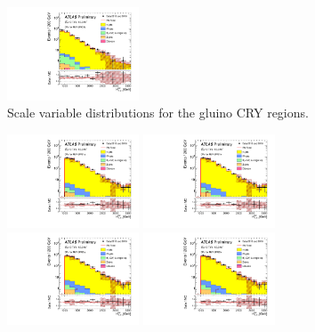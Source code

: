 \begin{figure}[tbph]
\begin{center}
\includegraphics[width=0.35\textwidth]{figures/ATLAS-CONF-2016-078_INT/N-1Plots/AtlasStyle/Preliminary/CRY_SRJigsawSRG3b_LastCut_CRY_minusone}
\end{center}
\caption{Scale variable distributions for the gluino CRY regions.}
\label{fig:CRY_SRJigsawSRG3a_LastCut_CRY_minusone}
\end{figure}

\clearpage
\begin{figure}[tbph]
\begin{center}
\includegraphics[width=0.35\textwidth]{figures/ATLAS-CONF-2016-078_INT/N-1Plots/AtlasStyle/Preliminary/CRY_SRJigsawSRS1a_LastCut_CRY_minusone}
\includegraphics[width=0.35\textwidth]{figures/ATLAS-CONF-2016-078_INT/N-1Plots/AtlasStyle/Preliminary/CRY_SRJigsawSRS1b_LastCut_CRY_minusone}
\includegraphics[width=0.35\textwidth]{figures/ATLAS-CONF-2016-078_INT/N-1Plots/AtlasStyle/Preliminary/CRY_SRJigsawSRS2a_LastCut_CRY_minusone}
\includegraphics[width=0.35\textwidth]{figures/ATLAS-CONF-2016-078_INT/N-1Plots/AtlasStyle/Preliminary/CRY_SRJigsawSRS2b_LastCut_CRY_minusone}

\end{center}
\end{figure}
